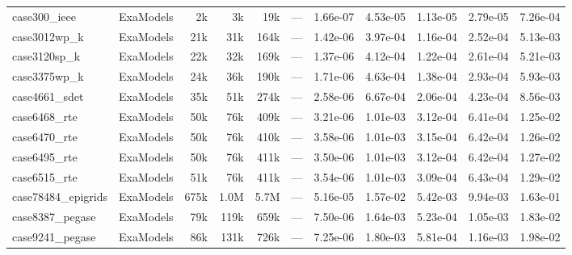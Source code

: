 {\begin{longtable}{@{}ll rrr rrr rr r@{}}
  case300\_ieee & ExaModels & 2k & 3k & 19k & --- & 1.66e-07 & 4.53e-05 & 1.13e-05 & 2.79e-05 & 7.26e-04 \\
  case3012wp\_k & ExaModels & 21k & 31k & 164k & --- & 1.42e-06 & 3.97e-04 & 1.16e-04 & 2.52e-04 & 5.13e-03 \\
  case3120sp\_k & ExaModels & 22k & 32k & 169k & --- & 1.37e-06 & 4.12e-04 & 1.22e-04 & 2.61e-04 & 5.21e-03 \\
  case3375wp\_k & ExaModels & 24k & 36k & 190k & --- & 1.71e-06 & 4.63e-04 & 1.38e-04 & 2.93e-04 & 5.93e-03 \\
  case4661\_sdet & ExaModels & 35k & 51k & 274k & --- & 2.58e-06 & 6.67e-04 & 2.06e-04 & 4.23e-04 & 8.56e-03 \\
  case6468\_rte & ExaModels & 50k & 76k & 409k & --- & 3.21e-06 & 1.01e-03 & 3.12e-04 & 6.41e-04 & 1.25e-02 \\
  case6470\_rte & ExaModels & 50k & 76k & 410k & --- & 3.58e-06 & 1.01e-03 & 3.15e-04 & 6.42e-04 & 1.26e-02 \\
  case6495\_rte & ExaModels & 50k & 76k & 411k & --- & 3.50e-06 & 1.01e-03 & 3.12e-04 & 6.42e-04 & 1.27e-02 \\
  case6515\_rte & ExaModels & 51k & 76k & 411k & --- & 3.54e-06 & 1.01e-03 & 3.09e-04 & 6.43e-04 & 1.29e-02 \\
  case78484\_epigrids & ExaModels & 675k & 1.0M & 5.7M & --- & 5.16e-05 & 1.57e-02 & 5.42e-03 & 9.94e-03 & 1.63e-01 \\
  case8387\_pegase & ExaModels & 79k & 119k & 659k & --- & 7.50e-06 & 1.64e-03 & 5.23e-04 & 1.05e-03 & 1.83e-02 \\
  case9241\_pegase & ExaModels & 86k & 131k & 726k & --- & 7.25e-06 & 1.80e-03 & 5.81e-04 & 1.16e-03 & 1.98e-02 \\
  \bottomrule
\end{longtable}
}

